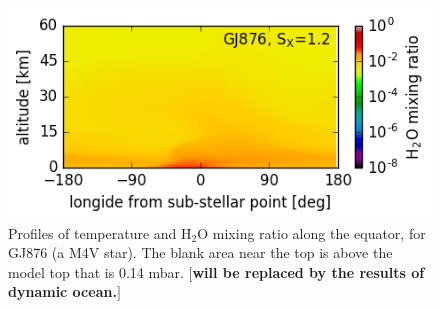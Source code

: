 \documentclass[11pt,numberedappendix,twocolappendix,]{emulateapj}
\def\water{H$_2$O }
\def\memo#1{\color{red}$[${\bf #1}$]$ \color{black}}
\begin{document}
\begin{figure}[!hbt]
\begin{minipage}{0.48\hsize}
\begin{center}
    \end{center}
     \end{minipage}
  \begin{minipage}{0.48\hsize}
    \begin{center}
    \includegraphics[width=\hsize]{fig/ANN0231-0287aijlAqOH0TLS_GJ876S12P21L40Q_xH2O.png}
    \end{center}
\end{minipage}
    \caption{Profiles of temperature and \water mixing ratio along the equator, for GJ876 (a M4V star). The blank area near the top is above the model top that is  0.14 mbar. \memo{will be replaced by the results of dynamic ocean.}}
\label{fig:3Dprofile_equator_GJ876}
\end{figure}
\end{document}
